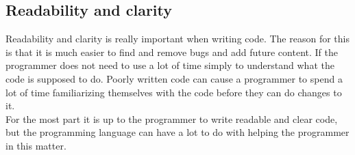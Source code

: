 \documentclass[12pt, a4paper]{article}
\begin{document}






\subsection{Readability and clarity}
Readability and clarity is really important when writing code. The reason for this is that it is much easier to find and remove bugs and add future content. If the programmer does not need to use a lot of time simply to understand what the code is supposed to do. Poorly written code can cause a programmer to spend a lot of time familiarizing themselves with the code before they can do changes to it.\\

For the most part it is up to the programmer to write readable and clear code, but the programming language can have a lot to do with helping the programmer in this matter.\\

\end{document}
